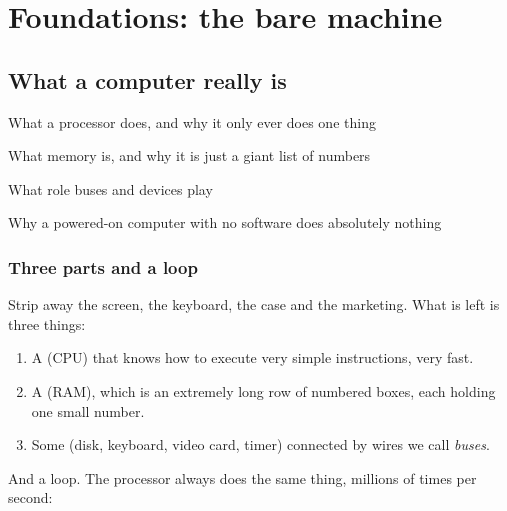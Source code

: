 \part{Foundations: the bare machine}

\chapter{What a computer really is}

\begin{goals}
  \item What a processor does, and why it only ever does one thing
  \item What memory is, and why it is just a giant list of numbers
  \item What role buses and devices play
  \item Why a powered-on computer with no software does absolutely nothing
\end{goals}

\section{Three parts and a loop}

Strip away the screen, the keyboard, the case and the marketing. What is left is three things:

\begin{enumerate}
  \item A  (CPU) that knows how to execute very simple instructions, very fast.
  \item A  (RAM), which is an extremely long row of numbered boxes, each holding
        one small number.
  \item Some  (disk, keyboard, video card, timer) connected by wires we call
        \emph{buses}.
\end{enumerate}

And a loop. The processor always does the same thing, millions of times per second:

\begin{center}
\end{center}

